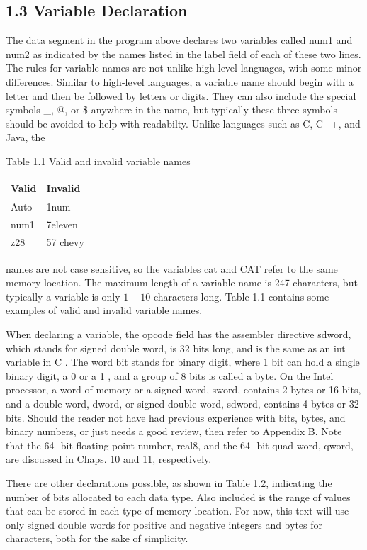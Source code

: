 \documentclass[10pt]{book}
\begin{document}
\subsection*{1.3 Variable Declaration}
The data segment in the program above declares two variables called num1 and num2 as indicated by the names listed in the label field of each of these two lines. The rules for variable names are not unlike high-level languages, with some minor differences. Similar to high-level languages, a variable name should begin with a letter and then be followed by letters or digits. They can also include the special symbols \_, @, or \$ anywhere in the name, but typically these three symbols should be avoided to help with readabilty. Unlike languages such as C, C++, and Java, the

Table 1.1 Valid and invalid variable names

\begin{center}
\begin{tabular}{|l|l|}
\hline
Valid & Invalid \\
\hline
Auto & 1num \\
\hline
num1 & 7eleven \\
\hline
z28 & 57 chevy \\
\hline
\end{tabular}
\end{center}

names are not case sensitive, so the variables cat and CAT refer to the same memory location. The maximum length of a variable name is 247 characters, but typically a variable is only $1-10$ characters long. Table 1.1 contains some examples of valid and invalid variable names.

When declaring a variable, the opcode field has the assembler directive sdword, which stands for signed double word, is 32 bits long, and is the same as an int variable in C . The word bit stands for binary digit, where 1 bit can hold a single binary digit, a 0 or a 1 , and a group of 8 bits is called a byte. On the Intel processor, a word of memory or a signed word, sword, contains 2 bytes or 16 bits, and a double word, dword, or signed double word, sdword, contains 4 bytes or 32 bits. Should the reader not have had previous experience with bits, bytes, and binary numbers, or just needs a good review, then refer to Appendix B. Note that the 64 -bit floating-point number, real8, and the 64 -bit quad word, qword, are discussed in Chaps. 10 and 11, respectively.

There are other declarations possible, as shown in Table 1.2, indicating the number of bits allocated to each data type. Also included is the range of values that can be stored in each type of memory location. For now, this text will use only signed double words for positive and negative integers and bytes for characters, both for the sake of simplicity.
\end{document}
